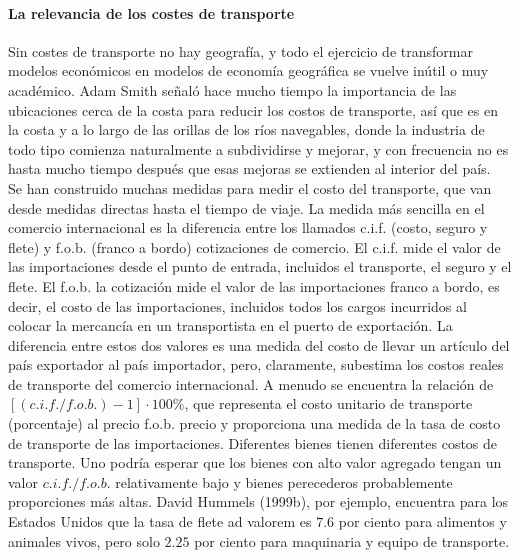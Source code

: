 \paragraph{La relevancia de los costes de transporte}
Sin costes de transporte no hay geografía, y todo el ejercicio de transformar modelos económicos en modelos de economía geográfica se vuelve inútil o muy académico. Adam Smith señaló hace mucho tiempo la importancia de las ubicaciones cerca de la costa para reducir los costos de transporte, así que es en la costa y a lo largo de las orillas de los ríos navegables, donde la industria de todo tipo comienza naturalmente a subdividirse y mejorar, y con frecuencia no es hasta mucho tiempo después que esas mejoras se extienden al interior del país.\\
Se han construido muchas medidas para medir el costo del transporte, que van desde medidas directas hasta el tiempo de viaje. La medida más sencilla en el comercio internacional es la diferencia entre los llamados c.i.f. (costo, seguro y flete) y f.o.b. (franco a bordo) cotizaciones de comercio. El c.i.f. mide el valor de las importaciones desde el punto de entrada, incluidos el transporte, el seguro y el flete. El f.o.b. la cotización mide el valor de las importaciones franco a bordo, es decir, el costo de las importaciones, incluidos todos los cargos incurridos al colocar la mercancía en un transportista en el puerto de exportación. La diferencia entre estos dos valores es una medida del costo de llevar un artículo del país exportador al país importador, pero, claramente, subestima los costos reales de transporte del comercio internacional. A menudo se encuentra la relación de $[(c.i.f./f.o.b.) -1] \cdot 100\%$, que representa el costo unitario de transporte (porcentaje) al precio f.o.b. precio y proporciona una medida de la tasa de costo de transporte de las importaciones. Diferentes bienes tienen diferentes costos de transporte. Uno podría esperar que los bienes con alto valor agregado tengan un valor $c.i.f./f.o.b.$ relativamente bajo y bienes perecederos probablemente proporciones más altas. David Hummels (1999b), por ejemplo, encuentra para los Estados Unidos que la tasa de flete ad valorem es $7.6$ por ciento para alimentos y animales vivos, pero solo $2.25$ por ciento para maquinaria y equipo de transporte.\\
